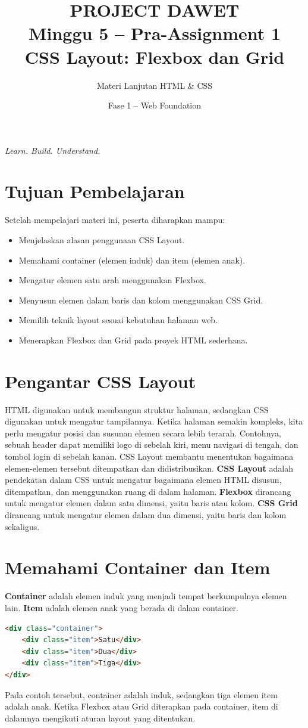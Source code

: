 \documentclass[11pt,a4paper]{article}
\title{\textcolor{dawetblue}{\textbf{PROJECT DAWET}}\\[.4em]\Large Minggu 5 -- Pra-Assignment 1\\[.3em]\large CSS Layout: Flexbox dan Grid}
\author{Materi Lanjutan HTML \& CSS}
\date{Fase 1 -- Web Foundation}
\begin{document}
\maketitle
\begin{center}\textit{Learn. Build. Understand.}\end{center}
\section{Tujuan Pembelajaran}
Setelah mempelajari materi ini, peserta diharapkan mampu:
\begin{itemize}[nosep]
\item Menjelaskan alasan penggunaan CSS Layout.
\item Memahami container (elemen induk) dan item (elemen anak).
\item Mengatur elemen satu arah menggunakan Flexbox.
\item Menyusun elemen dalam baris dan kolom menggunakan CSS Grid.
\item Memilih teknik layout sesuai kebutuhan halaman web.
\item Menerapkan Flexbox dan Grid pada proyek HTML sederhana.
\end{itemize}
\section{Pengantar CSS Layout}
HTML digunakan untuk membangun struktur halaman, sedangkan CSS digunakan untuk mengatur tampilannya. Ketika halaman semakin kompleks, kita perlu mengatur posisi dan susunan elemen secara lebih terarah.
Contohnya, sebuah header dapat memiliki logo di sebelah kiri, menu navigasi di tengah, dan tombol login di sebelah kanan. CSS Layout membantu menentukan bagaimana elemen-elemen tersebut ditempatkan dan didistribusikan.
\textbf{CSS Layout} adalah pendekatan dalam CSS untuk mengatur bagaimana elemen HTML disusun, ditempatkan, dan menggunakan ruang di dalam halaman.
\textbf{Flexbox} dirancang untuk mengatur elemen dalam satu dimensi, yaitu baris atau kolom. \textbf{CSS Grid} dirancang untuk mengatur elemen dalam dua dimensi, yaitu baris dan kolom sekaligus.
\section{Memahami Container dan Item}
\textbf{Container} adalah elemen induk yang menjadi tempat berkumpulnya elemen lain. \textbf{Item} adalah elemen anak yang berada di dalam container.
\begin{lstlisting}[language=HTML]
<div class="container">
    <div class="item">Satu</div>
    <div class="item">Dua</div>
    <div class="item">Tiga</div>
</div>
\end{lstlisting}
Pada contoh tersebut, container adalah induk, sedangkan tiga elemen item adalah anak. Ketika Flexbox atau Grid diterapkan pada container, item di dalamnya mengikuti aturan layout yang ditentukan.
\end{document}
